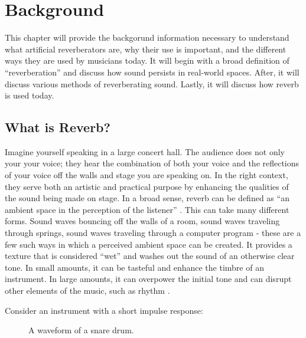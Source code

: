 \chapter{Background}
\hspace*{-0.155cm}This chapter will provide the backgorund information necessary to understand what artificial reverberators are, why their use is important, and the different ways they are used by musicians today. It will begin with a broad definition of ``reverberation'' and discuss how sound persists in real-world spaces. After, it will discuss various methods of reverberating sound. Lastly, it will discuss how reverb is used today.

\section{What is Reverb?}
Imagine yourself speaking in a large concert hall. The audience does not only your your voice; they hear the combination of both your voice and the reflections of your voice off the walls and stage you are speaking on. In the right context, they serve both an artistic and practical purpose by enhancing the qualities of the sound being made on stage. In a broad sense, reverb can be defined as ``an ambient space in the perception of the listener'' \cite{dattorro1997effect}. This can take many different forms. Sound waves bouncing off the walls of a room, sound waves traveling through springs, sound waves traveling through a computer program - these are a few such ways in which a perceived ambient space can be created. It provides a texture that is considered ``wet'' and washes out the sound of an otherwise clear tone. In small amounts, it can be tasteful and enhance the timbre of an instrument. In large amounts, it can overpower the initial tone and can disrupt other elements of the music, such as rhythm \cite{blesser2007spaces}.

Consider an instrument with a short impulse response:

\begin{figure}[h] %
	\begin{center}
		\caption{A waveform of a snare drum.}
	\end{center}
\end{figure}

